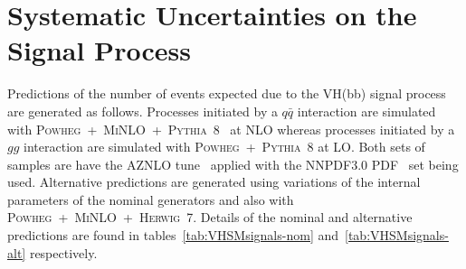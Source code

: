 \section{Systematic Uncertainties on the Signal Process}

Predictions of the number of events expected due to the VH(bb) signal process
are generated as follows. Processes initiated by a $q\bar{q}$ interaction are
simulated with
\textsc{Powheg}~+~\textsc{MiNLO}~+~\textsc{Pythia}~8~\cite{Luisoni2013,
  Sjostrand2008852} at NLO whereas processes initiated by a $gg$ interaction are
simulated with \textsc{Powheg}~+~\textsc{Pythia}~8 at LO. Both sets of samples
are have the AZNLO tune~\cite{Aad:2014xaa} applied with the NNPDF3.0
PDF~\cite{Ball:2014uwa} set being used. Alternative predictions are generated 
using variations of the internal parameters of the nominal generators and also
with \textsc{Powheg}~+~\textsc{MiNLO}~+~\textsc{Herwig}~7. Details of the
nominal and alternative predictions are found in
tables~\ref{tab:VHSMsignals-nom} and~\ref{tab:VHSMsignals-alt} respectively.









